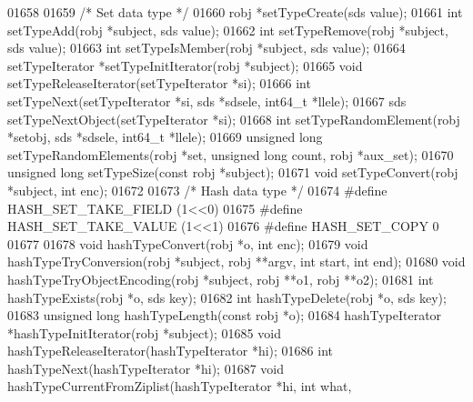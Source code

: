 \begin{DoxyCode}
{{{{{{{01658 
01659 \textcolor{comment}{/* Set data type */}
01660 robj *setTypeCreate(sds value);
01661 \textcolor{keywordtype}{int} setTypeAdd(robj *subject, sds value);
01662 \textcolor{keywordtype}{int} setTypeRemove(robj *subject, sds value);
01663 \textcolor{keywordtype}{int} setTypeIsMember(robj *subject, sds value);
01664 setTypeIterator *setTypeInitIterator(robj *subject);
01665 \textcolor{keywordtype}{void} setTypeReleaseIterator(setTypeIterator *si);
01666 \textcolor{keywordtype}{int} setTypeNext(setTypeIterator *si, sds *sdsele, int64\_t *llele);
01667 sds setTypeNextObject(setTypeIterator *si);
01668 \textcolor{keywordtype}{int} setTypeRandomElement(robj *setobj, sds *sdsele, int64\_t *llele);
01669 \textcolor{keywordtype}{unsigned} \textcolor{keywordtype}{long} setTypeRandomElements(robj *set, \textcolor{keywordtype}{unsigned} \textcolor{keywordtype}{long} count, robj *aux\_set);
01670 \textcolor{keywordtype}{unsigned} \textcolor{keywordtype}{long} setTypeSize(\textcolor{keyword}{const} robj *subject);
01671 \textcolor{keywordtype}{void} setTypeConvert(robj *subject, \textcolor{keywordtype}{int} enc);
01672 
01673 \textcolor{comment}{/* Hash data type */}
01674 \textcolor{preprocessor}{#}\textcolor{preprocessor}{define} \textcolor{preprocessor}{HASH\_SET\_TAKE\_FIELD} \textcolor{preprocessor}{(}1\textcolor{preprocessor}{<<}0\textcolor{preprocessor}{)}
01675 \textcolor{preprocessor}{#}\textcolor{preprocessor}{define} \textcolor{preprocessor}{HASH\_SET\_TAKE\_VALUE} \textcolor{preprocessor}{(}1\textcolor{preprocessor}{<<}1\textcolor{preprocessor}{)}
01676 \textcolor{preprocessor}{#}\textcolor{preprocessor}{define} \textcolor{preprocessor}{HASH\_SET\_COPY} 0
01677 
01678 \textcolor{keywordtype}{void} hashTypeConvert(robj *o, \textcolor{keywordtype}{int} enc);
01679 \textcolor{keywordtype}{void} hashTypeTryConversion(robj *subject, robj **argv, \textcolor{keywordtype}{int} start, \textcolor{keywordtype}{int} end);
01680 \textcolor{keywordtype}{void} hashTypeTryObjectEncoding(robj *subject, robj **o1, robj **o2);
01681 \textcolor{keywordtype}{int} hashTypeExists(robj *o, sds key);
01682 \textcolor{keywordtype}{int} hashTypeDelete(robj *o, sds key);
01683 \textcolor{keywordtype}{unsigned} \textcolor{keywordtype}{long} hashTypeLength(\textcolor{keyword}{const} robj *o);
01684 hashTypeIterator *hashTypeInitIterator(robj *subject);
01685 \textcolor{keywordtype}{void} hashTypeReleaseIterator(hashTypeIterator *hi);
01686 \textcolor{keywordtype}{int} hashTypeNext(hashTypeIterator *hi);
01687 \textcolor{keywordtype}{void} hashTypeCurrentFromZiplist(hashTypeIterator *hi, \textcolor{keywordtype}{int} what,
}}}}}}}
\end{DoxyCode}
